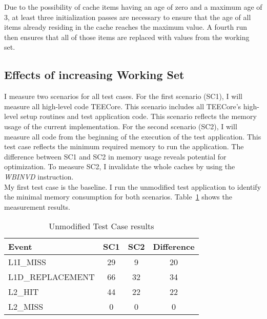 Due to the possibility of cache items having an age of zero and a maximum age of
3, at least three initialization passes are necessary to ensure that the age of
all items already residing in the cache reaches the maximum value. A fourth run
then ensures that all of those items are replaced with values from the working
set.

\FloatBarrier
\subsection{Effects of increasing Working Set}
\label{eval:mem_constraints:size}

I measure two scenarios for all test cases. For the first scenario (SC1), I will
measure all high-level code TEECore. This scenario includes all TEECore's
high-level setup routines and test application code. This scenario reflects the
memory usage of the current implementation. For the second scenario (SC2), I
will measure all code from the beginning of the execution of the test
application. This test case reflects the minimum required memory to run the
application. The difference between SC1 and SC2 in memory usage reveals
potential for optimization. To measure SC2, I invalidate the whole caches by
using the \textit{WBINVD} instruction. \\

My first test case is the baseline. I run the unmodified test application to
identify the minimal memory consumption for both scenarios.
Table~\ref{50:tab:ping_base} shows the measurement results. 

\begin{table}[ht]
  \centering
  \begin{tabular}{ |l||c|c|c| }
    \hline
    Event            & SC1 & SC2 & Difference \\
    \hline
    L1I\_MISS        & 29  & 9   & 20         \\
    L1D\_REPLACEMENT & 66  & 32  & 34         \\
    L2\_HIT          & 44  & 22  & 22         \\
    L2\_MISS         & 0   & 0   & 0          \\
    \hline
  \end{tabular}
  \caption{Unmodified Test Case results}
  \label{50:tab:ping_base}
\end{table}

